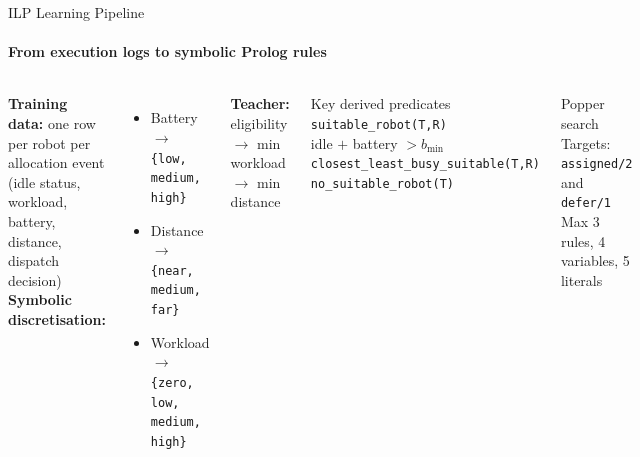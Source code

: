 \documentclass[aspectratio=169]{beamer}
\begin{document}
\begin{frame}[shrink=5]{ILP Learning Pipeline}
  \framesubtitle{From execution logs to symbolic Prolog rules}
  \begin{columns}
      \small
      \textbf{Training data:} one row per robot per allocation event\\
      (idle status, workload, battery, distance, dispatch decision)
      \vspace{0.3em}
      \textbf{Symbolic discretisation:}
      \begin{itemize}
        \item Battery $\to$ \texttt{\{low, medium, high\}}
        \item Distance $\to$ \texttt{\{near, medium, far\}}
        \item Workload $\to$ \texttt{\{zero, low, medium, high\}}
      \end{itemize}
      \vspace{0.3em}
      \textbf{Teacher:} eligibility $\to$ min workload $\to$ min distance
      \begin{block}{Key derived predicates}
        \small
        \texttt{suitable\_robot(T,R)}\\
        \quad idle $+$ battery $> b_{\min}$\\[4pt]
        \texttt{closest\_least\_busy\_suitable(T,R)}\\[4pt]
        \texttt{no\_suitable\_robot(T)}
      \end{block}
      \vspace{0.3em}
      \begin{block}{Popper search}
        \small
        Targets: \texttt{assigned/2} and \texttt{defer/1}\\
        Max 3 rules, 4 variables, 5 literals
      \end{block}
  \end{columns}
\end{frame}
\end{document}
